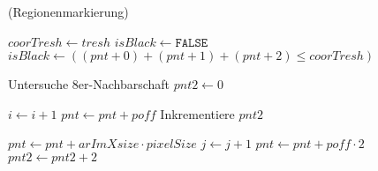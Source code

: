 \begin{algorithm}[!ht]
\caption{ (Regionenmarkierung)}
\label{alg:arlabeling-regionlabeling}
\begin{algorithmic}[1]
	\label{alg:arlabeling-regionlabeling-loop1-start}

		\label{alg:arlabeling-regionlabeling-loop2-start}

			\State $\mathit{coorTresh} \gets \mathit{tresh}$
			\label{alg:arlabeling-regionlabeling-threshold-start}
			\State $\mathit{isBlack} \gets \texttt{FALSE}$
			\State $\mathit{isBlack} \gets \left( \left(\mathit{pnt} + 0\right) + \left(\mathit{pnt} + 1\right) + \left(\mathit{pnt} + 2\right) \leq \mathit{coorTresh} \right)$
			\label{alg:arlabeling-regionlabeling-calcblack}

			\label{alg:arlabeling-regionlabeling-isblack?}
				\State Untersuche 8er-Nachbarschaft
				\label{alg:arlabeling-regionlabeling-black}
			\Else
				\State $\mathit{pnt2} \gets 0$
				\label{alg:arlabeling-regionlabeling-notblack}
			\EndIf
			\label{alg:arlabeling-regionlabeling-threshold-end}

			\State $i \gets i + 1$
			\label{alg:arlabeling-regionlabeling-inc1-start}
			\State $\mathit{pnt} \gets \mathit{pnt} + \mathit{poff}$
			\State Inkrementiere $\mathit{pnt2}$
			\label{alg:arlabeling-regionlabeling-inc1-end}
		\EndFor
		\label{alg:arlabeling-regionlabeling-loop2-end}

		\State $\mathit{pnt} \gets \mathit{pnt} + \mathit{arImXsize} \cdot \mathit{pixelSize}$
		\label{alg:arlabeling-regionlabeling-inc2-start}
		\State $j \gets j + 1$
		\State $\mathit{pnt} \gets \mathit{pnt} + \mathit{poff} \cdot 2$
		\State $\mathit{pnt2} \gets \mathit{pnt2} + 2$
		\label{alg:arlabeling-regionlabeling-inc2-end}
	\EndFor
	\label{alg:arlabeling-regionlabeling-loop1-end}
\end{algorithmic}
\end{algorithm}
